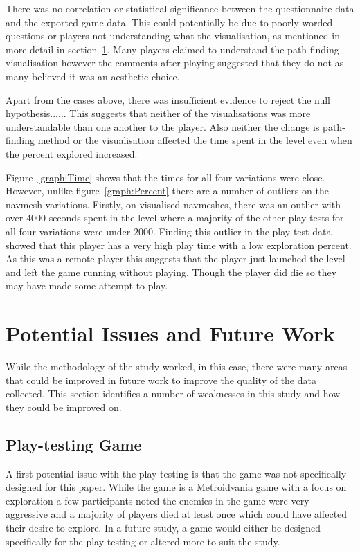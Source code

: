 \documentclass[journal]{IEEEtran}
\begin{document}
	
	There was no correlation or statistical significance between the questionnaire data and the exported game data. This could potentially be due to poorly worded questions or players not understanding what the visualisation, as mentioned in more detail in section~\ref{PotentialIssues}. Many players claimed to understand the path-finding visualisation however the comments after playing suggested that they do not as many believed it was an aesthetic choice.
	
	Apart from the cases above, there was insufficient evidence to reject the null hypothesis......  This suggests that neither of the visualisations was more understandable than one another to the player. Also neither the change is path-finding method or the visualisation affected the time spent in the level even when the percent explored increased.
	
	Figure~\ref{graph:Time} shows that the times for all four variations were close. However, unlike figure~\ref{graph:Percent} there are a number of outliers on the navmesh variations. Firstly, on visualised navmeshes, there was an outlier with over 4000 seconds spent in the level where a majority of the other play-tests for all four variations were under 2000. Finding this outlier in the play-test data showed that this player has a very high play time with a low exploration percent. As this was a remote player this suggests that the player just launched the level and left the game running without playing. Though the player did die so they may have made some attempt to play.
	
	
	\section{Potential Issues and Future Work} \label{PotentialIssues}
	While the methodology of the study worked, in this case, there were many areas that could be improved in future work to improve the quality of the data collected. This section identifies a number of weaknesses in this study and how they could be improved on. 
	
	\subsection{Play-testing Game} 
	A first potential issue with the play-testing is that the game was not specifically designed for this paper. While the game is a Metroidvania game with a focus on exploration a few participants noted the enemies in the game were very aggressive and a majority of players died at least once which could have affected their desire to explore. In a future study, a game would either be designed specifically for the play-testing or altered more to suit the study.  
	
\end{document}
